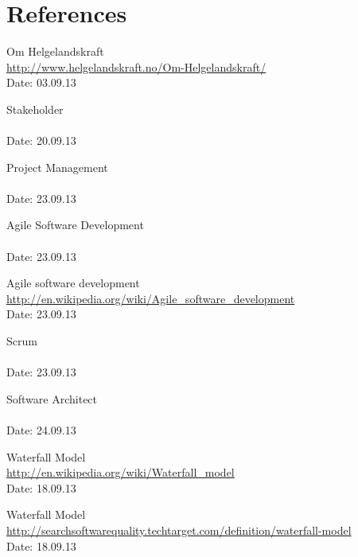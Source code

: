 \chapter{References}

\begin{thebibliography}{99}


	Om Helgelandskraft \\
	\href {http://www.helgelandskraft.no/Om-Helgelandskraft/}{http://www.helgelandskraft.no/Om-Helgelandskraft/} \\
	Date: 03.09.13

	Stakeholder \\
	\href{http://en.wikipedia.org/wiki/Stakeholder} \\
	Date: 20.09.13

	Project Management \\
	\href{http://en.wikipedia.org/wiki/Project_management} \\
	Date: 23.09.13

	Agile Software Development \\
	\href{http://en.wikipedia.org/wiki/Agile_software_development} \\
	Date: 23.09.13

	Agile software development \\
	\href {http://en.wikipedia.org/wiki/Agile_software_development}{http://en.wikipedia.org/wiki/Agile\_software\_development} \\
	Date: 23.09.13

	Scrum \\ 
	\href{http://no.wikipedia.org/wiki/Scrum} \\
	Date: 23.09.13

	Software Architect \\
	\href{http://en.wikipedia.org/wiki/Software_architect} \\
	Date: 24.09.13

	Waterfall Model \\
	\href {http://en.wikipedia.org/wiki/Waterfall_model}{http://en.wikipedia.org/wiki/Waterfall\_model} \\
	Date: 18.09.13

	Waterfall Model \\
	\href {http://searchsoftwarequality.techtarget.com/definition/waterfall-model}{http://searchsoftwarequality.techtarget.com/definition/waterfall-model} \\
	Date: 18.09.13


\end{thebibliography}
